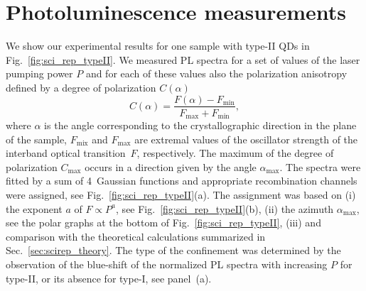 \section{Photoluminescence measurements}
We show our experimental results for one sample with type-II QDs in Fig.~\ref{fig:sci_rep_typeII}. We measured PL spectra for a set of values of the laser pumping power $P$ and for each of these values also the polarization anisotropy defined by a degree of polarization $C(\alpha)$
\begin{equation}
C(\alpha)=\frac{F(\alpha)-F_\mathrm{min}}{F_\mathrm{max}+F_\mathrm{min}},
\end{equation}
where $\alpha$ is the angle corresponding to the crystallographic direction in the plane of the sample, $F_\mathrm{mix}$ and $F_\mathrm{max}$ are extremal values of the oscillator strength of the interband optical transition~$F$, respectively. The maximum of the degree of polarization $C_\mathrm{max}$ occurs in a direction given by the angle $\alpha_\mathrm{max}$. The spectra were fitted by a sum of 4~Gaussian functions and appropriate recombination channels were assigned, see Fig.~\ref{fig:sci_rep_typeII}(a). The assignment was based on (i) the exponent $a$ of $F\propto P^a$, see Fig.~\ref{fig:sci_rep_typeII}(b), (ii) the azimuth $\alpha_\mathrm{max}$, see the polar graphs at the bottom of Fig.~\ref{fig:sci_rep_typeII}, (iii) and comparison with the theoretical calculations summarized in Sec.~\ref{sec:scirep_theory}. The type of the confinement was determined by the observation of the blue-shift of the normalized PL spectra with increasing $P$ for type-II, or its absence for type-I, see panel~(a).

